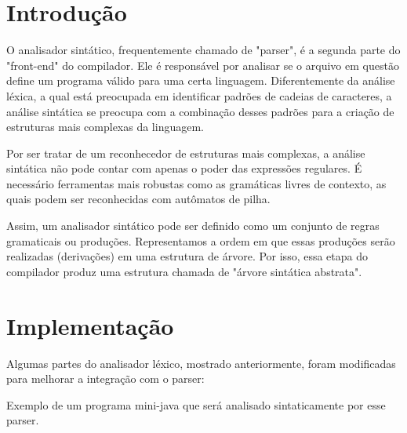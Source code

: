 \documentclass[12pt,a4paper,twoside]{report}
\begin{document}
\section{Introdução}

O analisador sintático, frequentemente chamado de "parser", é a segunda parte do "front-end" do compilador. Ele é responsável por analisar se o arquivo em questão define um programa válido para uma certa linguagem. Diferentemente da análise léxica, a qual está preocupada em identificar padrões de cadeias de caracteres, a análise sintática se preocupa com a combinação desses padrões para a criação de estruturas mais complexas da linguagem.

Por ser tratar de um reconhecedor de estruturas mais complexas, a análise sintática não pode contar com apenas o poder das expressões regulares. É necessário ferramentas mais robustas como as gramáticas livres de contexto, as quais podem ser reconhecidas com autômatos de pilha.

Assim, um analisador sintático pode ser definido como um conjunto de regras gramaticais ou produções. Representamos a ordem em que essas produções serão realizadas (derivações) em uma estrutura de árvore. Por isso, essa etapa do compilador produz uma estrutura chamada de "árvore sintática abstrata".


\section{Implementação}

Algumas partes do analisador léxico, mostrado anteriormente, foram modificadas para melhorar a integração com o parser:










Exemplo de um programa mini-java que será analisado sintaticamente por esse parser.







\clearpage
{}
\appendix
\end{document}
